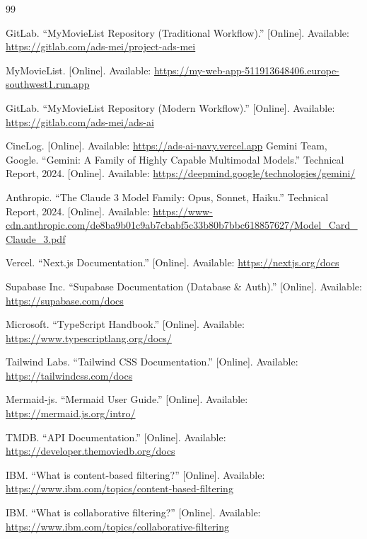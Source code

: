 \documentclass[a4paper,12pt]{report}
\begin{document}
\begin{thebibliography}{99}

GitLab. ``MyMovieList Repository (Traditional Workflow).'' [Online]. Available: \url{https://gitlab.com/ads-mei/project-ads-mei}

MyMovieList. [Online]. Available: \url{https://my-web-app-511913648406.europe-southwest1.run.app}

GitLab. ``MyMovieList Repository (Modern Workflow).'' [Online]. Available: \url{https://gitlab.com/ads-mei/ads-ai}

CineLog. [Online]. Available: \url{https://ads-ai-navy.vercel.app}
Gemini Team, Google. ``Gemini: A Family of Highly Capable Multimodal Models.'' Technical Report, 2024. [Online]. Available: \url{https://deepmind.google/technologies/gemini/}

Anthropic. ``The Claude 3 Model Family: Opus, Sonnet, Haiku.'' Technical Report, 2024. [Online]. Available: \url{https://www-cdn.anthropic.com/de8ba9b01c9ab7cbabf5c33b80b7bbc618857627/Model_Card_Claude_3.pdf}

Vercel. ``Next.js Documentation.'' [Online]. Available: \url{https://nextjs.org/docs}

Supabase Inc. ``Supabase Documentation (Database \& Auth).'' [Online]. Available: \url{https://supabase.com/docs}

Microsoft. ``TypeScript Handbook.'' [Online]. Available: \url{https://www.typescriptlang.org/docs/}

Tailwind Labs. ``Tailwind CSS Documentation.'' [Online]. Available: \url{https://tailwindcss.com/docs}

Mermaid-js. ``Mermaid User Guide.'' [Online]. Available: \url{https://mermaid.js.org/intro/}

TMDB. ``API Documentation.'' [Online]. Available: \url{https://developer.themoviedb.org/docs}

IBM. ``What is content-based filtering?'' [Online]. Available: \url{https://www.ibm.com/topics/content-based-filtering}

IBM. ``What is collaborative filtering?'' [Online]. Available: \url{https://www.ibm.com/topics/collaborative-filtering}

\end{thebibliography}
\end{document}
